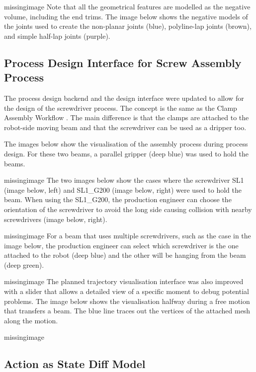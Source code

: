 missingimage
Note that all the geometrical features are modelled as the negative volume, including the end trims. The image below shows the negative models of the joints used to create the non-planar joints (blue), polyline-lap joints (brown), and simple half-lap joints (purple).

\subsection{Process Design Interface for Screw Assembly Process}
\label{subsection:exploration_4_process_design_interface_for_screw_assembly_process}

The process design backend and the design interface were updated to allow for the design of the screwdriver process. The concept is the same as the Clamp Assembly Workflow . The main difference is that the clamps are attached to the robot-side moving beam and that the screwdriver can be used as a dripper too.

The images below show the visualisation of the assembly process during process design. For these two beams, a parallel gripper (deep blue) was used to hold the beams.

missingimage
The two images below show the cases where the screwdriver SL1 (image below, left) and SL1\_G200 (image below, right) were used to hold the beam. When using the SL1\_G200, the production engineer can choose the orientation of the screwdriver to avoid the long side causing collision with nearby screwdrivers (image below, right). 

missingimage
For a beam that uses multiple screwdrivers, such as the case in the image below, the production engineer can select which screwdriver is the one attached to the robot (deep blue) and the other will be hanging from the beam (deep green).

missingimage
The planned trajectory visualisation interface was also improved with a slider that allows a detailed view of a specific moment to debug potential problems. The image below shows the visualisation halfway during a free motion that transfers a beam. The blue line traces out the vertices of the attached mesh along the motion.

missingimage

\subsection{Action as State Diff Model} 
\label{subsection:exploration_4_action_as_state_diff_model}

